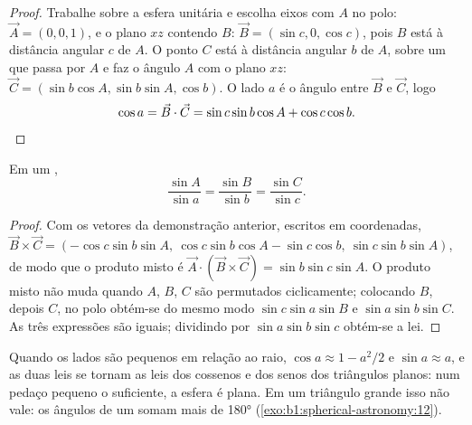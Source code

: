 \begin{proof}
Trabalhe sobre a esfera unitária e escolha eixos com $A$ no polo: $\vec A = (0, 0, 1)$, e o plano $xz$ contendo $B$: $\vec B = (\sin c, 0, \cos c)$, pois $B$ está à distância angular $c$ de $A$. O ponto $C$ está à distância angular $b$ de $A$, sobre um  que passa por $A$ e faz o ângulo $A$ com o plano $xz$: $\vec C = (\sin b\cos A, \sin b\sin A, \cos b)$. O lado $a$ é o ângulo entre $\vec B$ e $\vec C$, logo
\[
  \cos a = \vec B\cdot\vec C = \sin c\sin b\cos A + \cos c\cos b. \qedhere
\]
\end{proof}

\begin{theorem}\label{thm:b1:spherical-astronomy:sine-rule}
Em um ,
\[
  \frac{\sin A}{\sin a} = \frac{\sin B}{\sin b} = \frac{\sin C}{\sin c}.
\]
\end{theorem}

\begin{proof}
Com os vetores da demonstração anterior, escritos em coordenadas, $\vec B \times \vec C = (-\cos c\sin b\sin A,\ \cos c\sin b\cos A - \sin c\cos b,\
\sin c\sin b\sin A)$, de modo que o produto misto é $\vec A\cdot(\vec B\times\vec C) = \sin b\sin c\sin A$. O produto misto não muda quando $A$, $B$, $C$ são permutados ciclicamente; colocando $B$, depois $C$, no polo obtém-se do mesmo modo $\sin c\sin a\sin B$ e $\sin a\sin b\sin
C$. As três expressões são iguais; dividindo por $\sin a\sin b\sin c$ obtém-se a lei.
\end{proof}

Quando os lados são pequenos em relação ao raio, $\cos a \approx 1 -
a^2/2$ e $\sin a \approx a$, e as duas leis se tornam as leis dos cossenos e dos senos dos triângulos planos: num pedaço pequeno o suficiente, a esfera é plana. Em um triângulo grande isso não vale: os ângulos de um  somam mais de \ang{180} (\cref{exo:b1:spherical-astronomy:12}).

